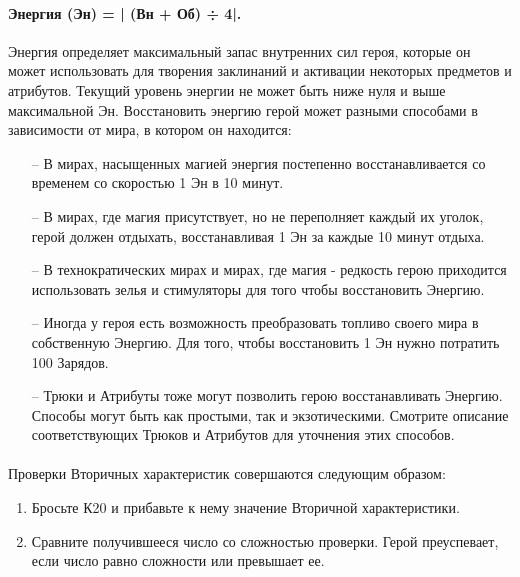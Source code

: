 \paragraph{Энергия (Эн) = | (Вн + Об) ÷ 4|.} Энергия определяет максимальный запас внутренних сил героя, которые он может использовать для творения заклинаний и активации некоторых предметов и атрибутов.
\newline
Текущий уровень энергии не может быть ниже нуля и выше максимальной Эн. Восстановить энергию герой может разными способами в зависимости от мира, в котором он находится:
\begin{itemize}
\item[--] В мирах, насыщенных магией энергия постепенно восстанавливается со временем со скоростью 1 Эн в 10 минут.
\item[--] В мирах, где магия присутствует, но не переполняет каждый их уголок, герой должен отдыхать, восстанавливая 1 Эн за каждые 10 минут отдыха.
\item[--] В технократических мирах и мирах, где магия - редкость герою приходится использовать зелья и стимуляторы для того чтобы восстановить Энергию.
\item[--] Иногда у героя есть возможность преобразовать топливо своего мира в собственную Энергию. Для того, чтобы восстановить 1 Эн нужно потратить 100 Зарядов.
\item[--] Трюки и Атрибуты тоже могут позволить герою восстанавливать Энергию. Способы могут быть как простыми, так и экзотическими. Смотрите описание соответствующих Трюков и Атрибутов для уточнения этих способов.
\end{itemize}
\paragraph{}Проверки Вторичных характеристик совершаются следующим образом:
\begin{enumerate}
\item Бросьте К20 и прибавьте к нему значение Вторичной характеристики.
\item Сравните получившееся число со сложностью проверки. Герой преуспевает, если число равно сложности или превышает ее.
\end{enumerate}
%